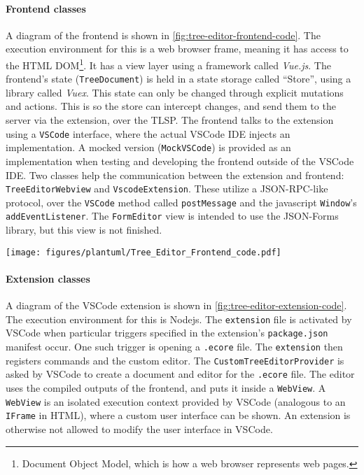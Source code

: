 \paragraph{Frontend classes}
A diagram of the frontend is shown in \cref{fig:tree-editor-frontend-code}.
The execution environment for this is a web browser frame, meaning it has access to the HTML DOM\footnote{Document Object Model, which is how a web browser represents web pages.}.
It has a view layer using a framework called \textit{Vue.js}.
The frontend's state (\texttt{TreeDocument}) is held in a state storage called ``Store'', using a library called \textit{Vuex}.
This state can only be changed through explicit mutations and actions.
This is so the store can intercept changes, and send them to the server via the extension, over the \acrlong{TLSP}.
The frontend talks to the extension using a \texttt{VSCode} interface, where the actual \gls{VSCode} \acrshort{IDE} injects an implementation.
A mocked version (\texttt{MockVSCode}) is provided as an implementation when testing and developing the frontend outside of the \gls{VSCode} \acrshort{IDE}.
Two classes help the communication between the extension and frontend: \texttt{TreeEditorWebview} and \texttt{VscodeExtension}.
These utilize a \gls{JSON-RPC}-like protocol, over the \texttt{VSCode} method called \texttt{postMessage} and the javascript \texttt{Window}'s \texttt{addEventListener}.
The \texttt{FormEditor} view is intended to use the JSON-Forms library, but this view is not finished.

\begin{sidewaysfigure}[htbp]  %
  \centering
  \texttt{[image: figures/plantuml/Tree\_Editor\_Frontend\_code.pdf]}
  \caption[Tree Editor Frontend class diagram]{Class diagram of the Tree Editor Frontend component.}\label{fig:tree-editor-frontend-code}
\end{sidewaysfigure}

\FloatBarrier

\paragraph{Extension classes}
A diagram of the \gls{VSCode} extension is shown in \cref{fig:tree-editor-extension-code}.
The execution environment for this is \gls{Nodejs}.
The \texttt{extension} file is activated by \gls{VSCode} when particular triggers specified in the extension's \texttt{package.json} manifest occur.
One such trigger is opening a \texttt{.ecore} file.
The \texttt{extension} then registers commands and the custom editor.
The \texttt{CustomTreeEditorProvider} is asked by \gls{VSCode} to create a document and editor for the \texttt{.ecore} file.
The editor uses the compiled outputs of the frontend, and puts it inside a \texttt{WebView}.
A \texttt{WebView} is an isolated execution context provided by \gls{VSCode} (analogous to an \texttt{IFrame} in HTML), where a custom user interface can be shown.
An extension is otherwise not allowed to modify the user interface in \gls{VSCode}.\\

